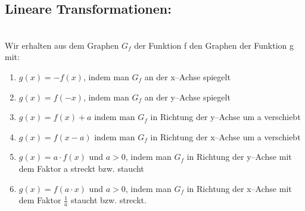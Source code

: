\documentclass[a4paper,twocolumn,10pt]{onepgnote}
\begin{document}
\subsection{Lineare Transformationen:}\\
Wir erhalten aus dem Graphen $G_f$ der Funktion f den Graphen der Funktion g mit:\\
\begin{enumerate}
    \item $g(x) = - f(x)$, indem man $G_f$ an der x--Achse spiegelt\\
\item $g(x) =f(-x)$, indem man $G_f$ an der y--Achse spiegelt\\
\item $g(x) = f(x) +a$ indem man $G_f$ in Richtung der y--Achse um a verschiebt\\
\item $g(x) =f(x-a)$ indem man $G_f$ in Richtung der x--Achse um a verschiebt\\
\item $g(x) =a\cdot f(x)$ und $a>0$, indem man $G_f$ in Richtung der y--Achse mit dem Faktor a streckt bzw. staucht\\
\item $g(x) =f(a\cdot x)$ und  $a>0$, indem man $G_f$ in Richtung der x--Achse mit dem Faktor $\frac{1}{a}$ staucht bzw. streckt.\\

\end{enumerate}
\end{document}
